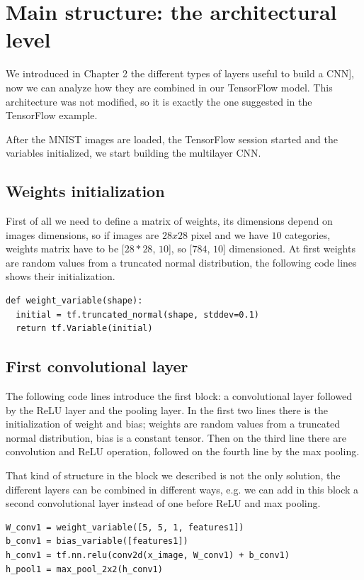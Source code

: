 \section{Main structure: the architectural level}

We introduced in Chapter 2 the different types of layers useful to build a \acs{CNN}], now we can analyze how they are combined in our TensorFlow model. This architecture was not modified, so it is exactly the one suggested in the TensorFlow example.

After the MNIST images are loaded, the TensorFlow session started and the variables initialized, we start building the multilayer \acs{CNN}.

\subsection{Weights initialization}

First of all we need to define a matrix of weights, its dimensions depend on images dimensions, so if images are $28x28$ pixel and we have $10$ categories, weights matrix have to be [$28*28$, $10$], so [$784$, $10$] dimensioned. At first weights are random values from a truncated normal distribution, the following code lines shows their initialization.

\begin{lstlisting}
def weight_variable(shape):
  initial = tf.truncated_normal(shape, stddev=0.1)
  return tf.Variable(initial)
\end{lstlisting}

\subsection{First convolutional layer}

The following code lines introduce the first block: a convolutional layer followed by the ReLU layer and the pooling layer. In the first two lines there is the initialization of weight and bias; weights are random values from a truncated normal distribution, bias is a constant tensor. Then on the third line there are convolution and ReLU operation, followed on the fourth line by the max pooling.

That kind of structure in the block we described is not the only solution, the different layers can be combined in different ways, e.g. we can add in this block a second convolutional layer instead of one before ReLU and max pooling.

\begin{lstlisting}
W_conv1 = weight_variable([5, 5, 1, features1])
b_conv1 = bias_variable([features1])
h_conv1 = tf.nn.relu(conv2d(x_image, W_conv1) + b_conv1)
h_pool1 = max_pool_2x2(h_conv1)
\end{lstlisting}

